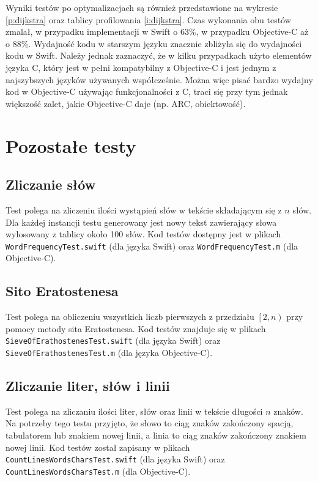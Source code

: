 \documentclass[mgr, shortabstract]{iithesis}
\begin{document}
Wyniki testów po optymalizacjach są również przedstawione na wykresie \ref{p:dijkstra} oraz tablicy profilowania \ref{i:dijkstra}. Czas wykonania obu testów zmalał, w przypadku implementacji w Swift o $63\%$, w przypadku Objective-C aż o $88\%$. Wydajność kodu w starszym języku znacznie zbliżyła się do wydajności kodu w Swift. Należy jednak zaznaczyć, że w kilku przypadkach użyto elementów języka C, który jest w pełni kompatybilny z Objective-C i jest jednym z najszybszych języków używanych współcześnie. Można więc pisać bardzo wydajny kod w Objective-C używając funkcjonalności z C, traci się przy tym jednak większość zalet, jakie Objective-C daje (np. ARC, obiektowość).

\section{Pozostałe testy}

\subsection{Zliczanie słów}

Test polega na zliczeniu ilości wystąpień słów w tekście składającym się z $n$ słów. Dla każdej instancji testu generowany jest nowy tekst zawierający słowa wylosowany z tablicy około 100 słów. Kod testów dostępny jest w plikach \texttt{WordFrequencyTest.swift} (dla języka Swift) oraz \texttt{WordFrequencyTest.m} (dla Objective-C).

\subsection{Sito Eratostenesa}

Test polega na obliczeniu wszystkich liczb pierwszych z przedziału $\left[2, n\right)$ przy pomocy metody sita Eratostenesa. Kod testów znajduje się w plikach \texttt{SieveOfErathostenesTest.swift} (dla języka Swift) oraz \texttt{SieveOfErathostenesTest.m} (dla języka Objective-C).

\subsection{Zliczanie liter, słów i linii}

Test polega na zliczaniu ilości liter, słów oraz linii w tekście długości $n$ znaków. Na potrzeby tego testu przyjęto, że słowo to ciąg znaków zakończony spacją, tabulatorem lub znakiem nowej linii, a linia to ciąg znaków zakończony znakiem nowej linii. Kod testów został zapisany w plikach \texttt{CountLinesWordsCharsTest.swift} (dla języka Swift) oraz \texttt{CountLinesWordsCharsTest.m} (dla Objective-C).
\end{document}
